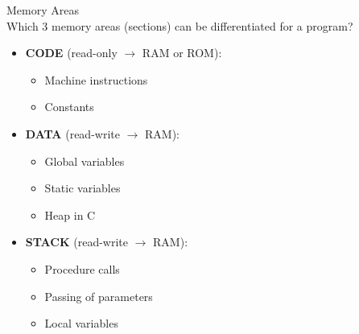\begin{example2}{Memory Areas}\\
Which 3 memory areas (sections) can be differentiated for a program?

\begin{itemize}
  \item \textbf{CODE} (read-only $\rightarrow$ RAM or ROM):
    \begin{itemize}
      \item Machine instructions
      \item Constants
    \end{itemize}
  \item \textbf{DATA} (read-write $\rightarrow$ RAM):
    \begin{itemize}
      \item Global variables
      \item Static variables
      \item Heap in C
    \end{itemize}
  \item \textbf{STACK} (read-write $\rightarrow$ RAM):
    \begin{itemize}
      \item Procedure calls
      \item Passing of parameters
      \item Local variables
    \end{itemize}
\end{itemize}
\end{example2}

